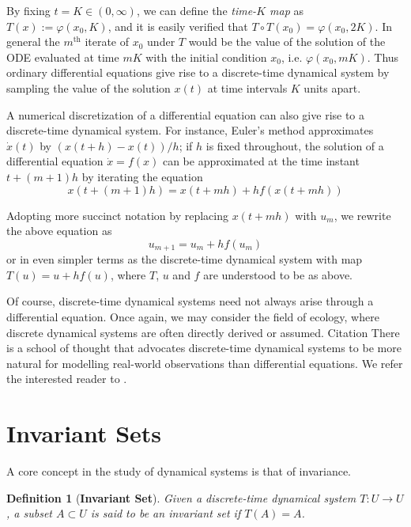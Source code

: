 \documentclass[a4paper,12pt,twoside]{report}
\newtheorem{Definition}{Definition}[]
\begin{document}
By fixing $t=K \in (0,\infty)$, we can define the \emph{time-$K$ map} as  $T(x):= \varphi(x_0,K)$, and it is easily verified that $T\circ T(x_0) = \varphi(x_0,2K)$. In general the $m^{\mbox{th}}$ iterate of $x_0$ under $T$ would be the value of the solution of the ODE evaluated at time $mK$ with the initial condition $x_0$, i.e. $\varphi(x_0, mK)$. 
Thus ordinary differential equations give rise to a discrete-time dynamical system by sampling the value of the solution $x(t)$ at time intervals $K$ units apart. 


A numerical discretization of a differential equation can also give rise to a discrete-time dynamical system. For instance, Euler's method approximates $\dot{x}(t)$ by $(x(t+h)-x(t))/h$; if $h$ is fixed throughout, the solution of a differential equation $\dot{x}=f(x)$ 
can be approximated at the time instant $t+(m+1)h$ by iterating the equation 
\begin{equation}
  x(t+(m+1)h) = x(t+mh) + h f(x(t+mh))
\end{equation}

Adopting more succinct notation by replacing $x(t+mh)$ with $u_m$, we rewrite the above equation as
\begin{equation}
u_{m+1} = u_m + hf(u_m)
\end{equation}
or in even simpler terms as the discrete-time dynamical system with map $T(u) = u + hf(u)$, where $T$, $u$ and $f$ are understood to be as above.


Of course, discrete-time dynamical systems need not always arise through a differential equation. Once again, we may consider the field of ecology, where discrete dynamical systems are often directly derived or assumed. Citation 
There is a school of thought that advocates discrete-time dynamical systems to be more natural for modelling real-world observations than differential equations. We refer the interested reader to \cite{saber2010introduction}.


\section{Invariant Sets}

A core concept in the study of dynamical systems is that of invariance. 
\begin{Definition}
  [\bf Invariant Set]\label{Dfn_InvariantSet}\rm
  Given a discrete-time dynamical system $T: U \to U$, a subset $A \subset U$ is said to be an \emph{invariant set} if $T(A) =A$. 
\end{Definition}
\end{document}
